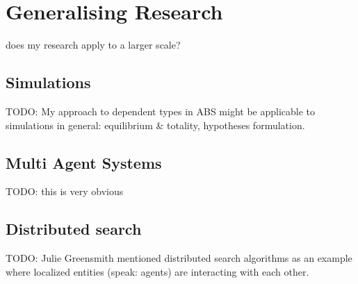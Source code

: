 \chapter{Generalising Research}
\label{chap:generalising}

does my research apply to a larger scale? 

\section{Simulations}
TODO: My approach to dependent types in ABS might be applicable to simulations in general: equilibrium \& totality, hypotheses formulation. 

\section{Multi Agent Systems}
TODO: this is very obvious

\section{Distributed search}
TODO: Julie Greensmith mentioned distributed search algorithms as an example where localized entities (speak: agents) are interacting with each other. 

